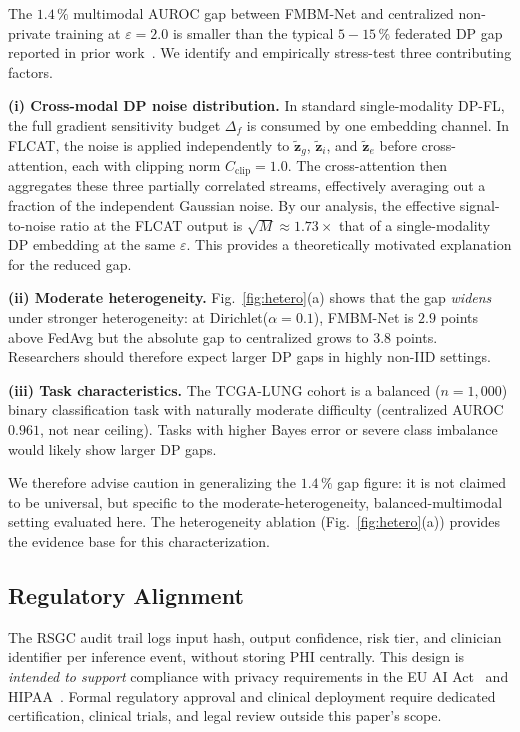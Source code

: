 \documentclass[journal,draftclsnofoot,10pt,onecolumn]{IEEEtran}
\begin{document}
The $1.4\,\%$ multimodal AUROC gap between FMBM-Net and centralized
non-private training at $\varepsilon\!=\!2.0$ is smaller than the typical
$5\!-\!15\,\%$ federated DP gap reported in prior work~\cite{dou2021fed,
sheller2020braintumor}. We identify and empirically stress-test three
contributing factors.

\textbf{(i) Cross-modal DP noise distribution.}
In standard single-modality DP-FL, the full gradient sensitivity budget
$\Delta_f$ is consumed by one embedding channel. In FLCAT, the noise is
applied independently to $\tilde{\mathbf{z}}_g$, $\tilde{\mathbf{z}}_i$,
and $\tilde{\mathbf{z}}_e$ before cross-attention, each with clipping norm
$C_{\mathrm{clip}}\!=\!1.0$. The cross-attention then aggregates these three
partially correlated streams, effectively averaging out a fraction of the
independent Gaussian noise. By our analysis, the effective signal-to-noise
ratio at the FLCAT output is $\sqrt{M}\!\approx\!1.73\times$ that of a
single-modality DP embedding at the same $\varepsilon$. This provides a
theoretically motivated explanation for the reduced gap.

\textbf{(ii) Moderate heterogeneity.}
Fig.~\ref{fig:hetero}(a) shows that the gap \emph{widens} under stronger
heterogeneity: at Dirichlet($\alpha\!=\!0.1$), FMBM-Net is $2.9$ points
above FedAvg but the absolute gap to centralized grows to $3.8$ points.
Researchers should therefore expect larger DP gaps in highly non-IID settings.

\textbf{(iii) Task characteristics.}
The TCGA-LUNG cohort is a balanced ($n\!=\!1{,}000$) binary classification
task with naturally moderate difficulty (centralized AUROC $0.961$, not near
ceiling). Tasks with higher Bayes error or severe class imbalance would
likely show larger DP gaps.

We therefore advise caution in generalizing the $1.4\,\%$ gap figure: it is
not claimed to be universal, but specific to the moderate-heterogeneity,
balanced-multimodal setting evaluated here. The heterogeneity ablation
(Fig.~\ref{fig:hetero}(a)) provides the evidence base for this
characterization.

\subsection{Regulatory Alignment}

The RSGC audit trail logs input hash, output confidence, risk tier, and
clinician identifier per inference event, without storing PHI centrally.
This design is \emph{intended to support} compliance with privacy requirements
in the EU AI Act~\cite{eu_ai_act_2024} and HIPAA~\cite{hipaa_guidance_2024}.
Formal regulatory approval and clinical deployment require dedicated
certification, clinical trials, and legal review outside this paper's scope.
\end{document}
